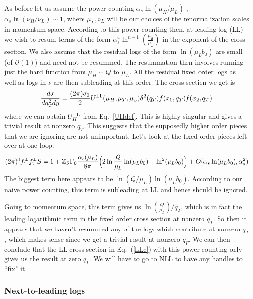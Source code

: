 \documentclass[a4,letterpaper,11pt]{article}
\newcommand{\be}{\begin{equation}}
\newcommand{\ee}{\end{equation}}
\newcommand{\bea}{\begin{eqnarray}}
\newcommand{\eea}{\end{eqnarray}}
\newcommand{\as}{\alpha_s}
\newcommand{\cO}{\mathcal{O}}
\newcommand{\zed}{\mathbb{Z}}
\newcommand{\eq}[1]{Eq.~\eqref{#1}}
\begin{document}
As before let us assume the power counting $ \alpha_s \ln( \mu_H/\mu_L)$ , $\alpha_s \ln( \nu_H/\nu_L) \sim 1$, where $\mu_L,\nu_L $ will be our choices of the renormalization scales in momentum space.
According to this power counting then, at leading log (LL) we wish to resum terms of the form $\as^n \ln^{n+1}(\frac{\mu_H}{\mu_L})$ in the exponent of the cross section. We also assume that the residual logs of the form $\ln( \mu_L b_0)$ are small (of $\cO(1)$) and need not be resummed. The resummation then involves running just the hard function from $\mu_H \sim Q$ to $\mu_L $. All the residual fixed order logs as well as logs in $\nu$ are then subleading at this order.
The cross section we get is
\bea
\frac{d \sigma}{d q_T^2 dy} =  \frac{(2\pi)\sigma_0}{2} U^{\rm LL}(\mu_H, \mu_T, \mu_L)  \delta^2(\vec{q_T})f(x_1,q_T)f(x_2,q_T)
\label{LLc}
\eea
where we can obtain $U_H^{\rm LL}$ from \eq{UHdef}.
This is highly singular and gives a trivial result at nonzero $q_T$.  This suggests that the supposedly higher order pieces that we are ignoring are not unimportant. Let's look at the fixed order pieces left over at one loop:
\be
\label{ffS}
(2\pi)^3 \tilde f^{\perp}_1 \tilde f^{\perp}_2 \tilde S =  1+  \zed_S \Gamma_0\frac{\as(\mu_L)}{8\pi}\Bigl( 2 \ln\frac{Q}{\mu_L}\ln(\mu_L b_0) + \ln^2(\mu_L b_0) \Bigr) + O(\alpha_s \ln(\mu_L b_0), \alpha_s^2)
\ee
The biggest term here appears to be $\ln(Q/\mu_L)\ln(\mu_L b_0)$. According to our naive power counting, this term is subleading at LL and hence should be ignored.


 Going to momentum space, this term gives us $\ln(\frac{Q}{\mu_L})/q_T$, which is in fact the leading logarithmic term in the fixed order cross section at nonzero $q_T$. So then it appears that we haven't resummed any of the logs which contribute at nonzero $q_T$, which makes sense since we get a trivial result at nonzero $q_T$. We can then conclude that the LL cross section in Eq.~(\ref{LLc}) with this power counting only gives us the result at zero $q_T$. We will have to go to NLL to have any handles to ``fix'' it. 
 
\subsubsection{Next-to-leading logs}
\label{ssec:NLL}
\end{document}

